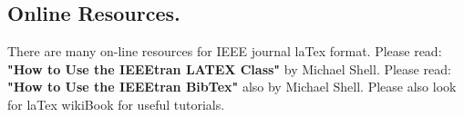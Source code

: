 \documentclass[rfvlsi_template_jrnl.tex]{subfiles}
\begin{document}
\subsection{Online Resources.}
There are many on-line resources for IEEE journal laTex format.  
Please read: \textbf{"How to Use the IEEEtran LATEX Class"} by Michael Shell.
Please read: \textbf{"How to Use the IEEEtran BibTex"} also by Michael Shell.
Please also look for laTex wikiBook for useful tutorials.
\end{document}

